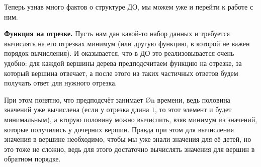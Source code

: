 Теперь узнав много фактов о структуре ДО, мы можем уже и перейти к работе с ним.

\textbf{Функция на отрезке.} Пусть нам дан какой-то набор данных и требуется вычислять на его отрезках минимум (или другую функцию, в которой не важен порядок вычисления). И оказывается, что в ДО это реализовывается очень удобно: для каждой вершины дерева предподсчитаем функцию на отрезке, за который вершина отвечает, а после этого из таких частичных ответов будем получать ответ для нужного отрезка.

При этом понятно, что предподсчёт занимает \O{n} времени, ведь половина значений уже вычислена (если у отрезка длина $1$, то этот элемент и будет минимальным), а вторую половину можно вычислить, взяв минимум из значений, которые получились у дочерних вершин. Правда при этом для вычисления значения в вершине необходимо, чтобы мы уже знали значения для её детей, но это тоже не сложно, ведь для этого достаточно вычислять значения для вершин в обратном порядке.

